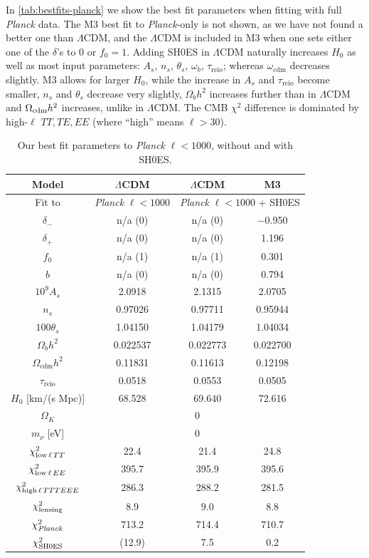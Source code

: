 In \cref{tab:bestfits-planck} we show the best fit parameters when fitting with full {\it Planck} data.
The M3 best fit to {\it Planck}-only is not shown, as we have not found a better one than $\Lambda$CDM, and the $\Lambda$CDM is included in M3 when one sets either one of the $\delta$'s to 0 or $f_0=1$.
Adding SH0ES in $\Lambda$CDM naturally increases $H_0$ as well as most input parameters: $A_s$, $n_s$, $\theta_s$, $\omega_b$, $\tau_\mathrm{reio}$; whereas $\omega_\mathrm{cdm}$ decreases slightly.
M3 allows for larger $H_0$, while the increase in $A_s$ and $\tau_\mathrm{reio}$ become smaller, $n_s$ and $\theta_s$ decrease very slightly, $\Omega_bh^2$ increases further than in $\Lambda$CDM and $\Omega_{\rm cdm}h^2$ increases, unlike in $\Lambda$CDM.
The CMB $\chi^2$ difference is dominated by high-$\ell$ $TT,TE,EE$ (where ``high'' means $\ell>30$).

\begin{table}[ht!]
\centering
\begin{tabular}{|c|c|c|c|}
\hline
Model & $\Lambda$CDM & $\Lambda$CDM & M3 \\
\hline
Fit to & {\it Planck} $\ell<1000$ & \multicolumn{2}{c|}{{\it Planck} $\ell<1000$ + SH0ES} \\
\hline
$\delta_-$ & n/a (0) & n/a (0) & $-$0.950 \\
$\delta_+$ & n/a (0) & n/a (0) & 1.196 \\
$f_0$ & n/a (1) & n/a (1) & 0.301 \\
\hline
$b$ & n/a (0) & n/a (0) & 0.794 \\
\hline
$10^9 A_s$ & 2.0918 & 2.1315 & 2.0705 \\
$n_s$ & 0.97026 & 0.97711 & 0.95944 \\
$100\theta_s$ & 1.04150 & 1.04179 & 1.04034 \\
$\Omega_b h^2$ & 0.022537 & 0.022773 & 0.022700 \\
$\Omega_\mathrm{cdm} h^2$ & 0.11831 & 0.11613 & 0.12198 \\
$\tau_\mathrm{reio}$ & 0.0518 & 0.0553 & 0.0505 \\
\hline
$H_0$ [km/(s Mpc)] & 68.528 & 69.640 & 72.616 \\
\hline
$\Omega_K$ & \multicolumn{3}{c|}{0} \\
$m_\nu$ [eV] & \multicolumn{3}{c|}{0} \\
\hline
$\chi^2_{{\rm low}\,\ell\,TT}$ & 22.4 & 21.4 & 24.8 \\
$\chi^2_{{\rm low}\,\ell\,EE}$ & 395.7 & 395.9 & 395.6 \\
$\chi^2_{{\rm high}\,\ell\,TTTEEE}$ & 286.3 & 288.2 & 281.5 \\
$\chi^2_{\rm lensing}$ & 8.9 & 9.0 & 8.8 \\
\hline
$\chi^2_{\it Planck}$ & 713.2 & 714.4 & 710.7 \\
\hline
$\chi^2_{\rm SH0ES}$ & (12.9) & 7.5 & 0.2 \\
\hline
\end{tabular}
\caption{Our best fit parameters to {\it Planck} $\ell<1000$, without and with SH0ES.}
\label{tab:bestfits-planck-lowl}
\end{table}

